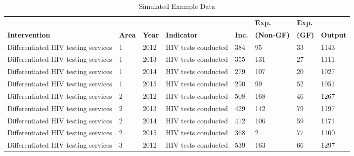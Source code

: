 \documentclass{article}
\begin{document}
\begin{table}[]
\centering
\caption{Simulated Example Data}
\label{my-label}
\begin{tabular}{llllllll}
                                                       &      &      &                                 &           & \textbf{Exp.} & \textbf{Exp.} &        \\
\textbf{Intervention}                                  & \textbf{Area} & \textbf{Year} & \textbf{Indicator} & \textbf{Inc.} & \textbf{(Non-GF)}           & \textbf{(GF)}   & \textbf{Output} \\
Differentiated HIV testing services                    & 1    & 2012 & HIV tests conducted              & 384       & 95                 & 33              & 1143   \\
Differentiated HIV testing services                    & 1    & 2013 & HIV tests conducted              & 355       & 131                & 27              & 1111   \\
Differentiated HIV testing services                    & 1    & 2014 & HIV tests conducted              & 279       & 107                & 20             & 1027   \\
Differentiated HIV testing services                    & 1    & 2015 & HIV tests conducted              & 290       & 99                 & 52              & 1051   \\
Differentiated HIV testing services                    & 2    & 2012 & HIV tests conducted              & 508       & 168                & 46              & 1267   \\
Differentiated HIV testing services                    & 2    & 2013 & HIV tests conducted              & 429       & 142                & 79              & 1197   \\
Differentiated HIV testing services                    & 2    & 2014 & HIV tests conducted              & 412       & 106                & 59              & 1171   \\
Differentiated HIV testing services                    & 2    & 2015 & HIV tests conducted              & 368       & 2                  & 77              & 1100   \\
Differentiated HIV testing services                    & 3    & 2012 & HIV tests conducted              & 539       & 163                & 66              & 1297   \\

\end{tabular}
\end{table}
\end{document}
